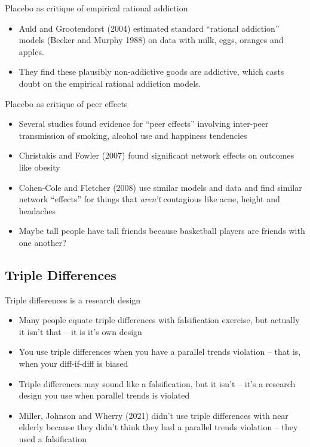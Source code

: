 \documentclass{beamer}
\begin{document}
\begin{frame}{Placebo as critique of empirical rational addiction}

\begin{itemize}
	\item Auld and Grootendorst (2004) estimated standard ``rational addiction'' models (Becker and Murphy 1988) on data with milk, eggs, oranges and apples.  
	\item They find these plausibly non-addictive goods are addictive, which casts doubt on the empirical rational addiction models.
\end{itemize}

\end{frame}

\begin{frame}{Placebo as critique of peer effects}

\begin{itemize}
	\item Several studies found evidence for ``peer effects'' involving inter-peer transmission of smoking, alcohol use and happiness tendencies
	\item Christakis and Fowler (2007) found significant network effects on outcomes like obesity
	\item Cohen-Cole and Fletcher (2008) use similar models and data and find similar network ``effects'' for things that \emph{aren't} contagious like acne, height and headaches
	\item Maybe tall people have tall friends because basketball players are friends with one another?
\end{itemize}

\end{frame}



\subsection{Triple Differences}

\begin{frame}{Triple differences is a research design}

\begin{itemize}

\item Many people equate triple differences with falsification exercise, but actually it isn't that -- it is it's own design
\item You use triple differences when you have a parallel trends violation -- that is, when your diff-if-diff is biased
\item Triple differences may sound like a falsification, but it isn't -- it's a research design you use when parallel trends is violated
\item Miller, Johnson and Wherry (2021) didn't use triple differences with near elderly because they didn't think they had a parallel trends violation -- they used a falsification
\end{itemize}

\end{frame}
\end{document}
